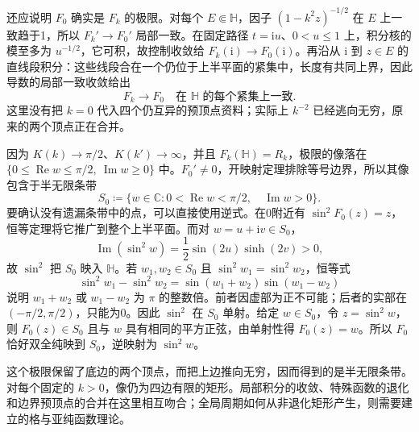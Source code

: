 \ProseParagraphBreak

还应说明 \(F_0\) 确实是 \(F_k\) 的极限。对每个 \(E\Subset\mathbb H\)，因子 \((1-k^2z)^{-1/2}\) 在 \(E\) 上一致趋于1，所以 \(F_k'\to F_0'\) 局部一致。在固定路径 \(t=\mathrm{i}u\)、\(0<u\le1\) 上，积分核的模至多为 \(u^{-1/2}\)，它可积，故控制收敛给 \(F_k(\mathrm{i})\to F_0(\mathrm{i})\)。再沿从 \(\mathrm{i}\) 到 \(z\in E\) 的直线段积分：这些线段合在一个仍位于上半平面的紧集中，长度有共同上界，因此导数的局部一致收敛给出
\[
 F_k\longrightarrow F_0
 \quad\text{在 }\mathbb H\text{ 的每个紧集上一致}.
\]
这里没有把 \(k=0\) 代入四个仍互异的预顶点资料；实际上 \(k^{-2}\) 已经逃向无穷，原来的两个顶点正在合并。

\ProseParagraphBreak

因为 \(K(k)\to\pi/2\)、\(K(k')\to\infty\)，并且 \(F_k(\mathbb H)=R_k\)，极限的像落在
\(\{0\le\operatorname{Re}w\le\pi/2,\ \operatorname{Im}w\ge0\}\)
中。\(F_0'\ne0\)，开映射定理排除等号边界，所以其像包含于半无限条带
\[
 S_0\coloneqq\{w\in\mathbb C:
 0<\operatorname{Re}w<\pi/2,\quad\operatorname{Im}w>0\}.
\]
要确认没有遗漏条带中的点，可以直接使用逆式。在0附近有
\(\sin^2F_0(z)=z\)，恒等定理将它推广到整个上半平面。而对 \(w=u+\mathrm{i}v\in S_0\)，
\[
 \operatorname{Im}(\sin^2w)
 =\frac12\sin(2u)\sinh(2v)>0,
\]
故 \(\sin^2\) 把 \(S_0\) 映入 \(\mathbb H\)。若 \(w_1,w_2\in S_0\) 且 \(\sin^2w_1=\sin^2w_2\)，恒等式
\[
 \sin^2w_1-\sin^2w_2
 =\sin(w_1+w_2)\sin(w_1-w_2)
\]
说明 \(w_1+w_2\) 或 \(w_1-w_2\) 为 \(\pi\) 的整数倍。前者因虚部为正不可能；后者的实部在 \((-\pi/2,\pi/2)\)，只能为0。因此 \(\sin^2\) 在 \(S_0\) 单射。给定 \(w\in S_0\)，令 \(z=\sin^2w\)，则 \(F_0(z)\in S_0\) 且与 \(w\) 具有相同的平方正弦，由单射性得 \(F_0(z)=w\)。所以 \(F_0\) 恰好双全纯映到 \(S_0\)，逆映射为 \(\sin^2w\)。

\ProseParagraphBreak

这个极限保留了底边的两个顶点，而把上边推向无穷，因而得到的是半无限条带。对每个固定的 \(k>0\)，像仍为四边有限的矩形。局部积分的收敛、特殊函数的退化和边界预顶点的合并在这里相互吻合；全局周期如何从非退化矩形产生，则需要建立的格与亚纯函数理论。
